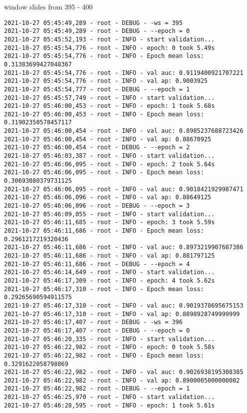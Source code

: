 \documentclass[11pt]{article}
\begin{document}
window slides from 395 - 400
\begin{verbatim}
2021-10-27 05:45:49,289 - root - DEBUG - -ws = 395
2021-10-27 05:45:49,289 - root - DEBUG - --epoch = 0
2021-10-27 05:45:52,193 - root - INFO - start validation...
2021-10-27 05:45:54,776 - root - INFO - epoch: 0 took 5.49s
2021-10-27 05:45:54,776 - root - INFO - Epoch mean loss: 0.31383699427048367
2021-10-27 05:45:54,776 - root - INFO - val auc: 0.9119400921707221
2021-10-27 05:45:54,776 - root - INFO - val ap: 0.9003925
2021-10-27 05:45:54,777 - root - DEBUG - --epoch = 1
2021-10-27 05:45:57,749 - root - INFO - start validation...
2021-10-27 05:46:00,453 - root - INFO - epoch: 1 took 5.68s
2021-10-27 05:46:00,453 - root - INFO - Epoch mean loss: 0.31902350578457117
2021-10-27 05:46:00,454 - root - INFO - val auc: 0.8985237688723426
2021-10-27 05:46:00,454 - root - INFO - val ap: 0.88670925
2021-10-27 05:46:00,454 - root - DEBUG - --epoch = 2
2021-10-27 05:46:03,387 - root - INFO - start validation...
2021-10-27 05:46:06,095 - root - INFO - epoch: 2 took 5.64s
2021-10-27 05:46:06,095 - root - INFO - Epoch mean loss: 0.30693080379731125
2021-10-27 05:46:06,095 - root - INFO - val auc: 0.9018421929987471
2021-10-27 05:46:06,096 - root - INFO - val ap: 0.88649125
2021-10-27 05:46:06,096 - root - DEBUG - --epoch = 3
2021-10-27 05:46:09,055 - root - INFO - start validation...
2021-10-27 05:46:11,685 - root - INFO - epoch: 3 took 5.59s
2021-10-27 05:46:11,686 - root - INFO - Epoch mean loss: 0.2961217219320436
2021-10-27 05:46:11,686 - root - INFO - val auc: 0.8973219907687386
2021-10-27 05:46:11,686 - root - INFO - val ap: 0.881797125
2021-10-27 05:46:11,686 - root - DEBUG - --epoch = 4
2021-10-27 05:46:14,649 - root - INFO - start validation...
2021-10-27 05:46:17,309 - root - INFO - epoch: 4 took 5.62s
2021-10-27 05:46:17,310 - root - INFO - Epoch mean loss: 0.29265690594911575
2021-10-27 05:46:17,310 - root - INFO - val auc: 0.9019378695675153
2021-10-27 05:46:17,310 - root - INFO - val ap: 0.8898928749999999
2021-10-27 05:46:17,407 - root - DEBUG - -ws = 396
2021-10-27 05:46:17,407 - root - DEBUG - --epoch = 0
2021-10-27 05:46:20,335 - root - INFO - start validation...
2021-10-27 05:46:22,982 - root - INFO - epoch: 0 took 5.58s
2021-10-27 05:46:22,982 - root - INFO - Epoch mean loss: 0.3291622058798869
2021-10-27 05:46:22,982 - root - INFO - val auc: 0.9026938195308385
2021-10-27 05:46:22,982 - root - INFO - val ap: 0.8900005000000002
2021-10-27 05:46:22,982 - root - DEBUG - --epoch = 1
2021-10-27 05:46:25,970 - root - INFO - start validation...
2021-10-27 05:46:28,595 - root - INFO - epoch: 1 took 5.61s

\end{verbatim}
\end{document}
